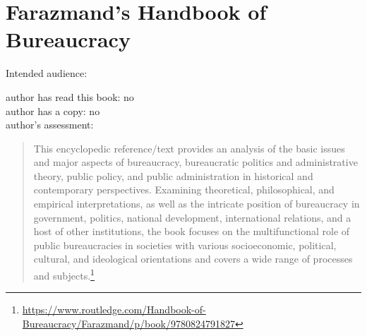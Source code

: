 \section{Farazmand's Handbook of Bureaucracy\label{review:farazmand_handbook}}

\cite{1994_Farazmand}

Intended audience:

author has read this book: no\\
author has a copy: no\\
author's assessment:


\begin{quote}
    This encyclopedic reference/text provides an analysis of the basic issues and major aspects of bureaucracy, bureaucratic politics and administrative theory, public policy, and public administration in historical and contemporary perspectives. Examining theoretical, philosophical, and empirical interpretations, as well as the intricate position of bureaucracy in government, politics, national development, international relations, and a host of other institutions, the book focuses on the multifunctional role of public bureaucracies in societies with various socioeconomic, political, cultural, and ideological orientations and covers a wide range of processes and subjects.\footnote{\href{https://www.routledge.com/Handbook-of-Bureaucracy/Farazmand/p/book/9780824791827}{https://www.routledge.com/Handbook-of-Bureaucracy/Farazmand/p/book/9780824791827}}
\end{quote}